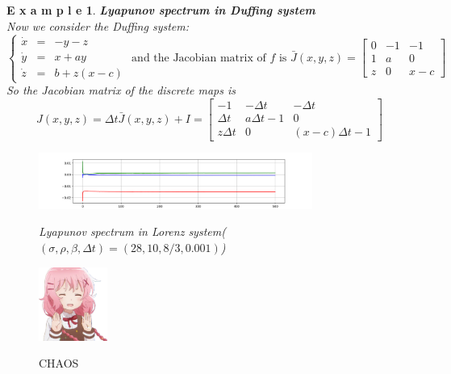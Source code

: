 \documentclass[12pt]{article}
\theoremstyle{plain}
\newtheorem{example}{\textbf{E x a m p l e}}[section]
\begin{document}
\begin{example}\textbf{Lyapunov spectrum in Duffing system}
\\\noindent Now we consider the Duffing system:
$$
\left\{\begin{array}{lll}
\dot x & = & -y-z \\
\dot y & = & x+ay \\
\dot z & = & b+z(x-c)
\end{array}\right. \text{ and the Jacobian matrix of $f$ is } \bar J(x, y, z) = \left[\begin{array}{lll}
0           & -1        & -1        \\
1           & a         & 0         \\
z           & 0         & x-c
\end{array}\right]
$$
So the Jacobian matrix of the discrete maps is 
$$
J(x, y, z) = \Delta t\bar J(x, y, z) + I = \left[\begin{array}{lll}
-1                  & -\Delta t         & -\Delta t         \\
\Delta t            & a\Delta t -1      & 0                 \\
z\Delta t           & 0                 & (x-c)\Delta t - 1
\end{array}\right]
$$
\begin{figure}[H]
\begin{center}
\includegraphics[width=0.8\textwidth]{figure/section3/Lya-spec-Lorenz-1.png} \\
\caption{Lyapunov spectrum in Lorenz system($(\sigma, \rho, \beta, \Delta t) = (28, 10, 8/3, 0.001)$)}
\end{center}
\end{figure}

\end{example}





\begin{figure}[H]
\begin{center}
\includegraphics[width=0.2\textwidth]{figure/CHAOS_1.png} \\
\caption{CHAOS}
\end{center}
\end{figure}
\end{document}
